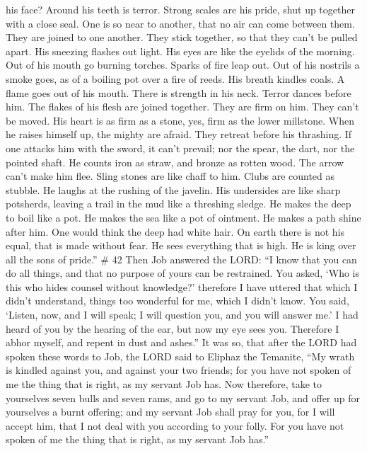 his face? Around his teeth is terror.  Strong scales are
his pride, shut up together with a close seal.  One is so
near to another, that no air can come between them.  They
are joined to one another. They stick together, so that they can't be
pulled apart.  His sneezing flashes out light. His eyes are
like the eyelids of the morning.  Out of his mouth go
burning torches. Sparks of fire leap out.  Out of his
nostrils a smoke goes, as of a boiling pot over a fire of reeds.
 His breath kindles coals. A flame goes out of his mouth.
 There is strength in his neck. Terror dances before him.
 The flakes of his flesh are joined together. They are firm
on him. They can't be moved.  His heart is as firm as a
stone, yes, firm as the lower millstone.  When he raises
himself up, the mighty are afraid. They retreat before his thrashing.
 If one attacks him with the sword, it can't prevail; nor
the spear, the dart, nor the pointed shaft.  He counts iron
as straw, and bronze as rotten wood.  The arrow can't make
him flee. Sling stones are like chaff to him.  Clubs are
counted as stubble. He laughs at the rushing of the javelin.
 His undersides are like sharp potsherds, leaving a trail
in the mud like a threshing sledge.  He makes the deep to
boil like a pot. He makes the sea like a pot of ointment. 
He makes a path shine after him. One would think the deep had white
hair.  On earth there is not his equal, that is made
without fear.  He sees everything that is high. He is king
over all the sons of pride.'' \# 42  Then Job answered the
LORD:  ``I know that you can do all things, and that no
purpose of yours can be restrained.  You asked, `Who is this
who hides counsel without knowledge?' therefore I have uttered that
which I didn't understand, things too wonderful for me, which I didn't
know.  You said, `Listen, now, and I will speak; I will
question you, and you will answer me.'  I had heard of you
by the hearing of the ear, but now my eye sees you. 
Therefore I abhor myself, and repent in dust and ashes.'' 
It was so, that after the LORD had spoken these words to Job, the LORD
said to Eliphaz the Temanite, ``My wrath is kindled against you, and
against your two friends; for you have not spoken of me the thing that
is right, as my servant Job has.  Now therefore, take to
yourselves seven bulls and seven rams, and go to my servant Job, and
offer up for yourselves a burnt offering; and my servant Job shall pray
for you, for I will accept him, that I not deal with you according to
your folly. For you have not spoken of me the thing that is right, as my
servant Job has.''

